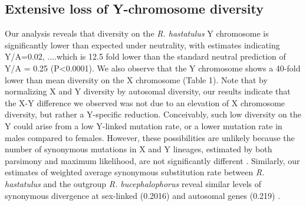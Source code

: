 \documentclass[9pt,twocolumn,twoside]{gsajnl}
\begin{document}
\subsection*{Extensive loss of Y-chromosome diversity}
Our analysis reveals that diversity on the \textit{R. hastatulus} Y chromosome is significantly lower than expected under neutrality, with estimates indicating Y/A=0.02, ....which is 12.5 fold lower than the standard neutral prediction of Y/A = 0.25 (P<0.0001). We also observe that the Y chromosome shows a 40-fold lower than mean diversity on the X chromosome (Table 1). Note that by normalizing X and Y diversity by autosomal diversity, our results indicate that the X-Y difference we observed was not due to an elevation of X chromosome diversity, but rather a Y-specific reduction. Conceivably, such low diversity on the Y could arise from a low Y-linked mutation rate, or a lower mutation rate in males compared to females. However, these possibilities are unlikely because the number of synonymous mutations in X and Y lineages, estimated by both parsimony and maximum likelihood, are not significantly different \citep{hough2014}. Similarly, our estimates of weighted average synonymous substitution rate between \textit{R. hastatulus} and the outgroup \textit{R. bucephalophorus} reveal similar levels of synonymous divergence at sex-linked (0.2016) and autosomal genes (0.219) \citep{hough2014}.


\end{document}
